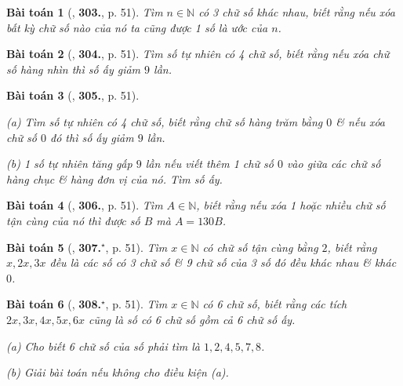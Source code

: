 \documentclass{article}
\numberwithin{equation}{section}
\newtheorem{baitoan}{Bài toán}
\begin{document}
\begin{baitoan}[\cite{Binh_Toan_6_tap_1}, \textbf{303.}, p. 51]
	Tìm $n\in\mathbb{N}$ có 3 chữ số khác nhau, biết rằng nếu xóa bất kỳ chữ số nào của nó ta cũng được 1 số là ước của $n$.	
\end{baitoan}

\begin{baitoan}[\cite{Binh_Toan_6_tap_1}, \textbf{304.}, p. 51]
	Tìm số tự nhiên có 4 chữ số, biết rằng nếu xóa chữ số hàng nhìn thì số ấy giảm $9$ lần.
\end{baitoan}

\begin{baitoan}[\cite{Binh_Toan_6_tap_1}, \textbf{305.}, p. 51]
	\begin{enumerate*}
		\item[(a)] Tìm số tự nhiên có 4 chữ số, biết rằng chữ số hàng trăm bằng $0$ \& nếu xóa chữ số $0$ đó thì số ấy giảm $9$ lần.
		\item[(b)] 1 số tự nhiên tăng gấp $9$ lần nếu viết thêm 1 chữ số $0$ vào giữa các chữ số hàng chục \& hàng đơn vị của nó. Tìm số ấy.
	\end{enumerate*}	
\end{baitoan}

\begin{baitoan}[\cite{Binh_Toan_6_tap_1}, \textbf{306.}, p. 51]
	Tìm $A\in\mathbb{N}$, biết rằng nếu xóa 1 hoặc nhiều chữ số tận cùng của nó thì được số $B$ mà $A = 130B$.
\end{baitoan}

\begin{baitoan}[\cite{Binh_Toan_6_tap_1}, \textbf{307.}${}^\star$, p. 51]
	Tìm $x\in\mathbb{N}$ có chữ số tận cùng bằng $2$, biết rằng $x,2x,3x$ đều là các số có 3 chữ số \& 9 chữ số của 3 số đó đều khác nhau \& khác $0$.
\end{baitoan}

\begin{baitoan}[\cite{Binh_Toan_6_tap_1}, \textbf{308.}${}^\star$, p. 51]
	Tìm $x\in\mathbb{N}$ có 6 chữ số, biết rằng các tích $2x,3x,4x,5x,6x$ cũng là số có 6 chữ số gồm cả 6 chữ số ấy.
	\begin{enumerate*}
		\item[(a)] Cho biết 6 chữ số của số phải tìm là $1,2,4,5,7,8$.
		\item[(b)] Giải bài toán nếu không cho điều kiện (a).
	\end{enumerate*}
\end{baitoan}

\end{document}
